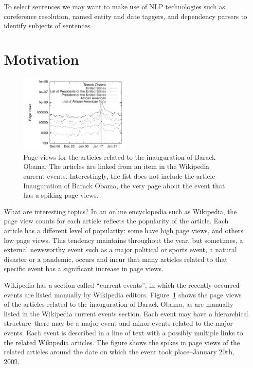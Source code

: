 \documentclass[11pt]{article}
\newcommand{\war}[1]{{\sf\small #1}}
\begin{document}
To select sentences we may want to make use of NLP technologies such as coreference resolution, named entity and date taggers, and dependency parsers to identify subjects of sentences.

\section{Motivation}

\begin{figure}
\centering
\includegraphics[width=0.5\textwidth]{figures/obama.pdf}
\caption{Page views for the articles related to the inauguration of Barack Obama. The articles are linked from an item in the Wikipedia current events. Interestingly, the list does not include the article \war{Inauguration of Barack Obama}, the very page about the event that has a spiking page views.}
\label{fig:obama-sparkline}
\end{figure}

What are interesting topics? In an online encyclopedia such as Wikipedia, the page view counts for each article reflects the popularity of the article. Each article has a different level of popularity: some have high page views, and others low page views. This tendency maintains throughout the year, but sometimes, a external newsworthy event such as a major political or sports event, a natural disaster or a pandemic, occurs and incur that many articles related to that specific event has a significant increase in page views.

Wikipedia has a section called ``current events'', in which the recently occurred events are listed manually by Wikipedia editors.
Figure~\ref{fig:obama-sparkline} shows the page views of the articles related to the inauguration of Barack Obama, as are manually listed in the Wikipedia current events section.
Each event may have a hierarchical structure--there may be a major event and minor events related to the major events.
Each event is described in a line of text with a possibly multiple links to the related Wikipedia articles.
The figure shows the spikes in page views of the related articles around the date on which the event took place--January 20th, 2009.
\end{document}
